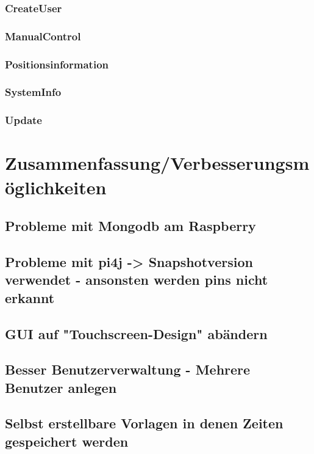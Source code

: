 \subsubsection{CreateUser}
\subsubsection{ManualControl}
\subsubsection{Positionsinformation}
\subsubsection{SystemInfo}
\subsubsection{Update}

\section{Zusammenfassung/Verbesserungsmöglichkeiten}
\subsection{Probleme mit Mongodb am Raspberry}
\subsection{Probleme mit pi4j -> Snapshotversion verwendet - ansonsten werden pins nicht erkannt}
\subsection{GUI auf "Touchscreen-Design" abändern}
\subsection{Besser Benutzerverwaltung - Mehrere Benutzer anlegen}
\subsection{Selbst erstellbare Vorlagen in denen Zeiten gespeichert werden}
